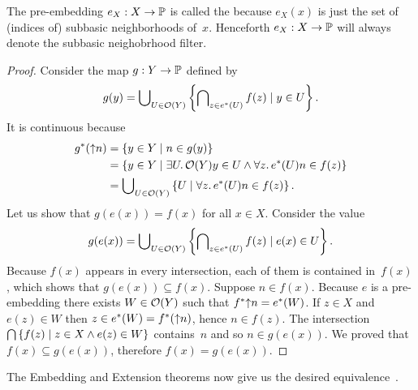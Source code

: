\noindent
%
The pre-embedding $e_X : X \to \mathbb{P}$ is called the  because $e_X(x)$ is just the set of (indices
of) subbasic neighborhoods of~$x$. Henceforth $e_X : X \to \mathbb{P}$
will always denote the subbasic neighobrhood filter.


\begin{proof}
  Consider the map $g : Y \to \mathbb{P}$ defined by
  \begin{equation*}
    g(y) = \bigcup\nolimits_{U \in \mathcal{O}(Y)} \left\{
      \bigcap\nolimits_{z \in e^{*}(U)} f(z)
      \mid
      y \in U
    \right\}.
  \end{equation*}
  It is continuous because
  \begin{align*}
    g^{*}({\uparrow}n) &=
    \{y \in Y \mid n \in g(y)\} \\
    &=
    \{y \in Y \mid \exists U .\,{
        \mathcal{O}(Y)}{y \in U \land
        \forall z .\,{e^{*}(U)}{n \in f(z)}
      }
    \} \\
    &=
    \bigcup\nolimits_{U \in \mathcal{O}(Y)} \left\{
        U \mid
        \forall z .\,{e^{*}(U)}{n \in f(z)}
      \right\}.
  \end{align*}
  Let us show that $g(e(x)) = f(x)$ for all $x \in X$. Consider the
  value
  \begin{align*}
    g(e(x)) =
    \bigcup\nolimits_{U \in \mathcal{O}(Y)} \left\{
      \bigcap\nolimits_{z \in e^{*}(U)} f(z)
      \mid
      e(x) \in U \right\}.
  \end{align*}
  Because $f(x)$ appears in every intersection, each of them is
  contained in~$f(x)$, which shows that $g(e(x)) \subseteq f(x)$.
  Suppose $n \in f(x)$. Because $e$ is a pre-embedding there exists $W
  \in \mathcal{O}(Y)$ such that $f^{*}{{\uparrow}n} = e^{*}(W)$. If
  $z \in X$ and $e(z) \in W$ then $z \in e^{*}(W) =
  f^{*}({\uparrow}n)$, hence $n \in f(z)$. The intersection
  $\bigcap\nolimits \left\{f(z) \mid z \in X \land e(z) \in W \right\}$
  contains~$n$ and so $n \in g(e(x))$. We proved that $f(x) \subseteq
  g(e(x))$, therefore $f(x) = g(e(x))$.
\end{proof}

\noindent
%
The Embedding and Extension theorems now give us the desired
equivalence~.

